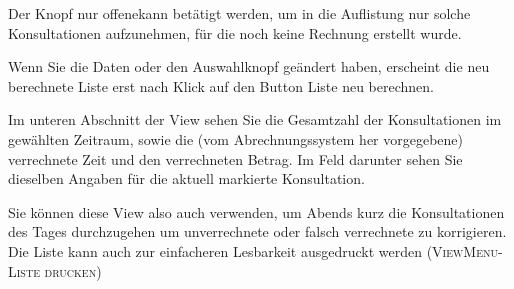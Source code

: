 Der Knopf \glqq nur offene\grqq kann betätigt werden, um in die Auflistung nur
solche Konsultationen aufzunehmen, für die noch keine Rechnung erstellt wurde.

Wenn Sie die Daten oder den Auswahlknopf geändert haben, erscheint die neu
berechnete Liste erst nach Klick auf den Button \glqq Liste neu berechnen\grqq.

Im unteren Abschnitt der View sehen Sie die Gesamtzahl der Konsultationen im
gewählten Zeitraum, sowie die (vom Abrechnungssystem her vorgegebene)
verrechnete Zeit und den verrechneten Betrag. Im Feld darunter sehen Sie
dieselben Angaben für die aktuell markierte Konsultation.

Sie können diese View also auch verwenden, um Abends kurz die Konsultationen des Tages
durchzugehen um unverrechnete oder falsch verrechnete zu korrigieren. Die Liste
kann auch zur einfacheren Lesbarkeit ausgedruckt werden (\textsc{ViewMenu-Liste drucken})

\clearpage

